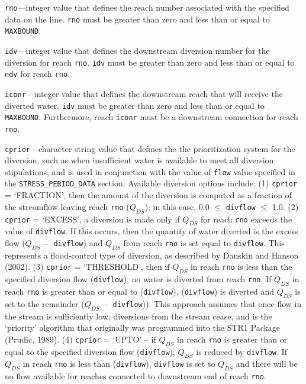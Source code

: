 \item \texttt{rno}---integer value that defines the reach number associated with the specified data on the line. \texttt{rno} must be greater than zero and less than or equal to \texttt{MAXBOUND}.

\item \texttt{idv}---integer value that defines the downstream diversion number for the diversion for reach \texttt{rno}. \texttt{idv} must be greater than zero and less than or equal to \texttt{ndv} for reach \texttt{rno}.

\item \texttt{iconr}---integer value that defines the downstream reach that will receive the diverted water. \texttt{idv} must be greater than zero and less than or equal to \texttt{MAXBOUND}. Furthermore, reach  \texttt{iconr} must be a downstream connection for reach \texttt{rno}.

\item \texttt{cprior}---character string value that defines the the prioritization system for the diversion, such as when insufficient water is available to meet all diversion stipulations, and is used in conjunction with the value of \texttt{flow} value specified in the \texttt{STRESS\_PERIOD\_DATA} section. Available diversion options include:  (1) \texttt{cprior} = `FRACTION', then the amount of the diversion is computed as a fraction of the streamflow leaving reach \texttt{rno} ($Q_{DS}$); in this case, 0.0 $\le$ \texttt{divflow} $\le$ 1.0.  (2) \texttt{cprior} = `EXCESS', a diversion is made only if $Q_{DS}$ for reach \texttt{rno} exceeds the value of \texttt{divflow}. If this occurs, then the quantity of water diverted is the excess flow ($Q_{DS} -$ \texttt{divflow}) and $Q_{DS}$ from reach \texttt{rno} is set equal to \texttt{divflow}. This represents a flood-control type of diversion, as described by Danskin and Hanson (2002). (3) \texttt{cprior} = `THRESHOLD', then if $Q_{DS}$ in reach \texttt{rno} is less than the specified diversion flow (\texttt{divflow}), no water is diverted from reach \texttt{rno}. If $Q_{DS}$ in reach \texttt{rno} is greater than or equal to (\texttt{divflow}), (\texttt{divflow}) is diverted and $Q_{DS}$ is set to the remainder ($Q_{DS} -$ \texttt{divflow})). This approach assumes that once flow in the stream is sufficiently low, diversions from the stream cease, and is the `priority' algorithm that originally was programmed into the STR1 Package (Prudic, 1989).  (4) \texttt{cprior} = `UPTO' -- if $Q_{DS}$ in reach \texttt{rno} is greater than or equal to the specified diversion flow (\texttt{divflow}), $Q_{DS}$ is reduced by \texttt{divflow}. If $Q_{DS}$ in reach \texttt{rno} is less than (\texttt{divflow}), \texttt{divflow} is set to $Q_{DS}$ and there will be no flow available for reaches connected to downstream end of reach \texttt{rno}.

